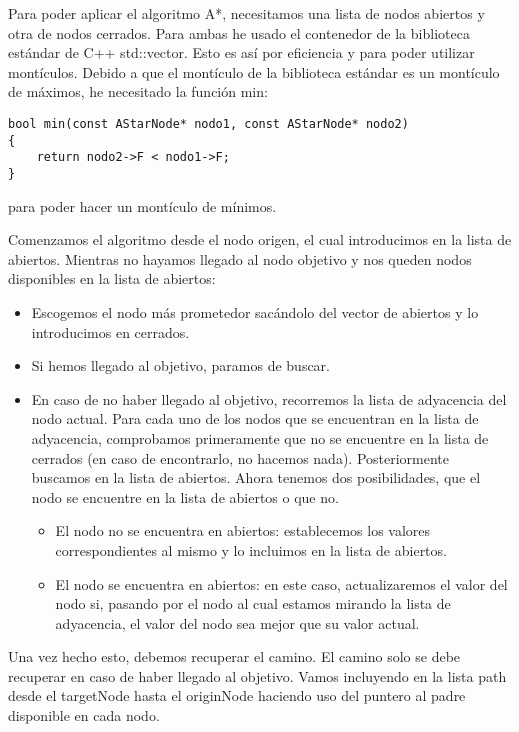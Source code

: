 Para poder aplicar el algoritmo A*, necesitamos una lista de nodos abiertos y otra de nodos cerrados. Para ambas he usado el contenedor de la biblioteca est\'andar de C++ std::vector. Esto es as\'i por eficiencia y para poder utilizar mont\'iculos. Debido a que el mont\'iculo de la biblioteca est\'andar es un mont\'iculo de m\'aximos, he necesitado la funci\'on min:

\begin{lstlisting}
bool min(const AStarNode* nodo1, const AStarNode* nodo2)
{
    return nodo2->F < nodo1->F;
}
\end{lstlisting}

para poder hacer un mont\'iculo de m\'inimos. 

Comenzamos el algoritmo desde el nodo origen, el cual introducimos en la lista de abiertos. Mientras no hayamos llegado al nodo objetivo y nos queden nodos disponibles en la lista de abiertos:
\begin{itemize}
	\item Escogemos el nodo m\'as prometedor sac\'andolo del vector de abiertos y lo introducimos en cerrados. 
	\item Si hemos llegado al objetivo, paramos de buscar.
	\item En caso de no haber llegado al objetivo, recorremos la lista de adyacencia del nodo actual. Para cada uno de los nodos que se encuentran en la lista de adyacencia, comprobamos primeramente que no se encuentre en la lista de cerrados (en caso de encontrarlo, no hacemos nada). Posteriormente buscamos en la lista de abiertos. Ahora tenemos dos posibilidades, que el nodo se encuentre en la lista de abiertos o que no. 
	\begin{itemize}
		\item El nodo no se encuentra en abiertos: establecemos los valores correspondientes al mismo y lo incluimos en la lista de abiertos.
		\item El nodo se encuentra en abiertos: en este caso, actualizaremos el valor del nodo si, pasando por el nodo al cual estamos mirando la lista de adyacencia, el valor del nodo sea mejor que su valor actual. 
	\end{itemize}
\end{itemize}


Una vez hecho esto, debemos recuperar el camino. El camino solo se debe recuperar en caso de haber llegado al objetivo. Vamos incluyendo en la lista path desde el targetNode hasta el originNode haciendo uso del puntero al padre disponible en cada nodo. 